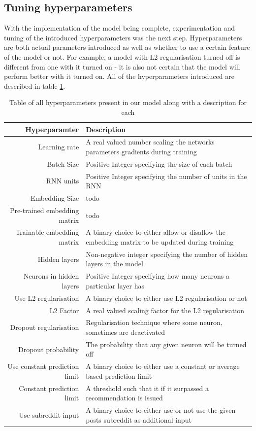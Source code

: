 \subsection{Tuning hyperparameters}
With the implementation of the model being complete, experimentation and tuning of the introduced hyperparameters was the next step. Hyperparameters are both actual parameters introduced as well as whether to use a certain feature of the model or not. For example, a model with L2 regularisation turned off is different from one with it turned on - it is also not certain that the model will perform better with it turned on. All of the hyperparameters introduced are described in table \ref{table:hyperparameters}.
\begin{table}[h!]
    \centering
    \begin{tabular}{ r  p{7cm} }
        \hline
        \textbf{Hyperparamter}  &  \textbf{Description} \\ \hline \hline
        Learning rate & A real valued number scaling the networks parameters gradients during training  \\ \hline
        Batch Size & Positive Integer specifying the size of each batch \\ \hline
        RNN units & Positive Integer specifying the number of units in the RNN  \\ \hline
        Embedding Size & todo \\ \hline
        Pre-trained embedding matrix & todo \\ \hline
        Trainable embedding matrix & A binary choice to either allow or disallow the embedding matrix to be updated during training \\ \hline
        Hidden layers & Non-negative integer specifying the number of hidden layers in the model \\ \hline
        Neurons in hidden layers & Positive Integer specifying how many neurons a particular layer has \\ \hline
        Use L2 regularisation & A binary choice to either use L2 regularisation or not \\ \hline
        L2 Factor & A real valued scaling factor for the L2 regularisation \\ \hline
        Dropout regularisation& Regularisation technique where some neuron, sometimes are deactivated \\ \hline
        Dropout probability & The probability that any given neuron will be turned off \\ \hline
        Use constant prediction limit & A binary choice to either use a constant or average based prediction limit \\ \hline
        Constant prediction limit & A threshold such that it if it surpassed a recommendation is issued  \\ \hline
        Use subreddit input & A binary choice to either use or not use the given posts subreddit as additional input \\ \hline
    \end{tabular}
    \caption{Table of all hyperparameters present in our model along with a description for each}
    \label{table:hyperparameters}
\end{table}
